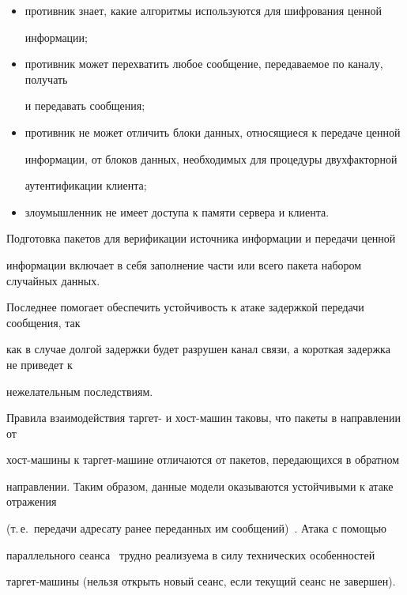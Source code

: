     \begin{itemize}


\item противник знает, какие алгоритмы используются для шифрования ценной 


информации;


\item противник может перехватить любое сообщение, передаваемое по каналу, получать 


и передавать сообщения;


\item противник не может отличить блоки данных, относящиеся к передаче ценной 


информации, от блоков данных, необходимых для процедуры двухфакторной 


аутентификации клиента;


\item злоумышленник не имеет доступа к памяти сервера и клиента.


\end{itemize}





    Подготовка пакетов для верификации источника информации и передачи ценной 


информации включает в себя заполнение части или всего пакета набором случайных данных. 


Последнее помогает обеспечить устойчивость к атаке задержкой передачи сообщения, так 


как в случае долгой задержки будет разрушен канал связи, а короткая задержка не приведет к 


нежелательным последствиям. 


    


    Правила взаимодействия таргет- и хост-машин таковы, что пакеты в на\-прав\-ле\-нии от 


хост-машины к таргет-машине отличаются от пакетов, пе\-ре\-да\-ющих\-ся в обратном 


направлении. Таким образом, данные модели оказываются устойчивыми к атаке отражения 


(т.\,е.\ передачи адресату ранее переданных им сообщений)~\cite{9-pis}. Атака с помощью 


параллельного сеанса~\cite{9-pis} трудно реализуема в силу технических особенностей 


таргет-машины (нельзя открыть новый сеанс, если текущий сеанс не завершен).


